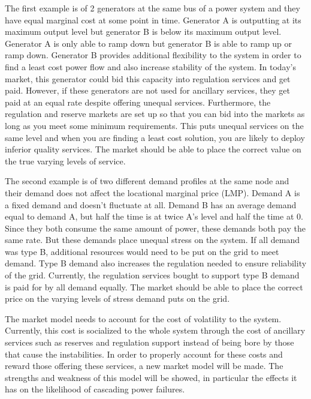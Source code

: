 The first example is of 2 generators at the same bus of a power system and they have equal marginal cost at some point in time.  Generator A is outputting at its maximum output level but generator B is below its maximum output level.  Generator A is only able to ramp down but generator B is able to ramp up or ramp down.  Generator B provides additional flexibility to the system in order to find a least cost power flow and also increase stability of the system.  In today's market, this generator could bid this capacity into regulation services and get paid.  However, if these generators are not used for ancillary services, they get paid at an equal rate despite offering unequal services.   Furthermore, the regulation and reserve markets are set up so that you can bid into the markets as long as you meet some minimum requirements.  This puts unequal services on the same level and when you are finding a least cost solution, you are likely to deploy inferior quality services.  The market should be able to place the correct value on the true varying levels of service.

The second example is of two different demand profiles at the same node and their demand does not affect the locational marginal price (LMP).  Demand A is a fixed demand and doesn't fluctuate at all.  Demand B has an average demand equal to demand A, but half the time is at twice A's level and half the time at 0.  Since they both consume the same amount of power, these demands both pay the same rate.  But these demands place unequal stress on the system.  If all demand was type B, additional resources would need to be put on the grid to meet demand.  Type B demand also increases the regulation needed to ensure reliability of the grid.  Currently, the regulation services bought to support type B demand is paid for by all demand equally.  The market should be able to place the correct price on the varying levels of stress demand puts on the grid.     

The market model needs to account for the cost of volatility to the system.  Currently, this cost is socialized to the whole system through the cost of ancillary services such as reserves and regulation support instead of being bore by those that cause the instabilities.  In order to properly account for these costs and reward those offering these services, a new market model will be made.  The strengths and weakness of this model will be showed, in particular the effects it has on the likelihood of  cascading power failures.

